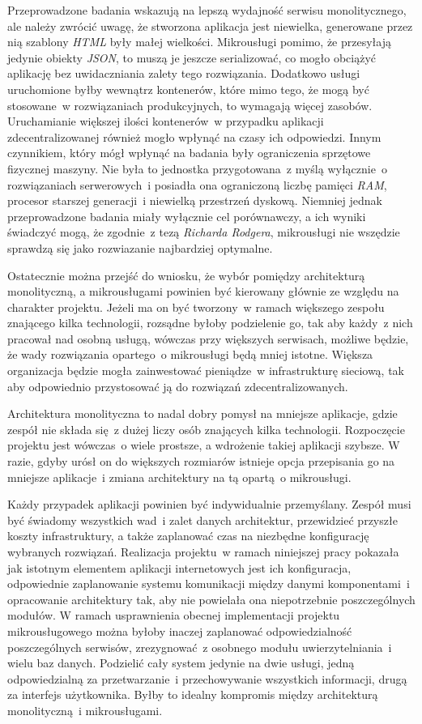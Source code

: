 Przeprowadzone badania wskazują na lepszą wydajność serwisu monolitycznego, ale należy zwrócić uwagę, że stworzona aplikacja jest niewielka, generowane przez nią szablony \textit{HTML} były małej wielkości. Mikrousługi pomimo, że przesyłają jedynie obiekty \textit{JSON}, to muszą je jeszcze serializować, co mogło obciążyć aplikację bez uwidaczniania zalety tego rozwiązania. Dodatkowo usługi uruchomione byłby wewnątrz kontenerów, które mimo tego, że mogą być stosowane~w rozwiązaniach produkcyjnych, to wymagają więcej zasobów. Uruchamianie większej ilości kontenerów~w przypadku aplikacji zdecentralizowanej również mogło wpłynąć na czasy ich odpowiedzi. Innym czynnikiem, który mógł wpłynąć na badania były ograniczenia sprzętowe fizycznej maszyny. Nie była to jednostka przygotowana~z myślą wyłącznie~o rozwiązaniach serwerowych~i posiadła ona ograniczoną liczbę pamięci \textit{RAM}, procesor starszej generacji~i niewielką przestrzeń dyskową. Niemniej jednak przeprowadzone badania miały wyłącznie cel porównawczy, a ich wyniki świadczyć mogą, że zgodnie~z tezą \textit{Richarda Rodgera}, mikrousługi nie wszędzie sprawdzą się jako rozwiazanie najbardziej optymalne\cite{Rodger:2019}.

Ostatecznie można przejść do wniosku, że wybór pomiędzy architekturą monolityczną, a mikrousługami powinien być kierowany głównie ze względu na charakter projektu. Jeżeli ma on być tworzony~w ramach większego zespołu znającego kilka technologii, rozsądne byłoby podzielenie go, tak aby każdy~z nich pracował nad osobną usługą, wówczas przy większych serwisach, możliwe będzie, że wady rozwiązania opartego~o mikrousługi będą mniej istotne. Większa organizacja będzie mogła zainwestować pieniądze~w infrastrukturę sieciową, tak aby odpowiednio przystosować ją do rozwiązań zdecentralizowanych. 

Architektura monolityczna to nadal dobry pomysł na mniejsze aplikacje, gdzie zespół nie składa się~z dużej liczy osób znających kilka technologii. Rozpoczęcie projektu jest wówczas~o wiele prostsze, a wdrożenie takiej aplikacji szybsze. W razie, gdyby urósł on do większych rozmiarów istnieje opcja przepisania go na mniejsze aplikacje~i zmiana architektury na tą opartą~o mikrousługi.

Każdy przypadek aplikacji powinien być indywidualnie przemyślany. Zespół musi być świadomy wszystkich wad~i zalet danych architektur, przewidzieć przyszłe koszty infrastruktury, a także zaplanować czas na niezbędne konfigurację wybranych rozwiązań. Realizacja projektu~w ramach niniejszej pracy pokazała jak istotnym elementem aplikacji internetowych jest ich konfiguracja, odpowiednie zaplanowanie systemu komunikacji między danymi komponentami~i opracowanie architektury tak, aby nie powielała ona niepotrzebnie poszczególnych modułów. W ramach usprawnienia obecnej implementacji projektu mikrousługowego można byłoby inaczej zaplanować odpowiedzialność poszczególnych serwisów, zrezygnować~z osobnego modułu uwierzytelniania~i wielu baz danych. Podzielić cały system jedynie na dwie usługi, jedną odpowiedzialną za przetwarzanie~i przechowywanie wszystkich informacji, drugą za interfejs użytkownika. Byłby to idealny kompromis między architekturą monolityczną~i mikrousługami.
